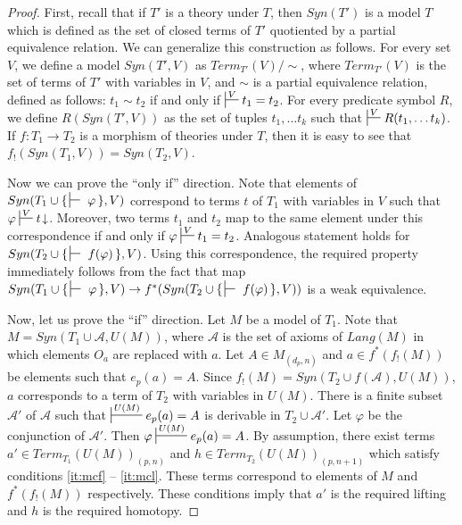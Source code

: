 \documentclass[reqno]{amsart}
\theoremstyle{definition}
\theoremstyle{remark}
\numberwithin{figure}{section}
\begin{document}
\begin{proof}
First, recall that if $T'$ is a theory under $T$, then $Syn(T')$ is a model $T$ which is defined as the set of closed terms of $T'$ quotiented by a partial equivalence relation.
We can generalize this construction as follows.
For every set $V$, we define a model $Syn(T',V)$ as $Term_{T'}(V)/\!\sim$, where $Term_{T'}(V)$ is the set of terms of $T'$ with variables in $V$,
and $\sim$ is a partial equivalence relation, defined as follows: $t_1 \sim t_2$ if and only if $\sststile{}{V} t_1 = t_2$.
For every predicate symbol $R$, we define $R(Syn(T',V))$ as the set of tuples $t_1, \ldots t_k$ such that $\sststile{}{V} R(t_1, \ldots t_k)$.
If $f : T_1 \to T_2$ is a morphism of theories under $T$, then it is easy to see that $f_!(Syn(T_1,V)) = Syn(T_2,V)$.

Now we can prove the ``only if'' direction.
Note that elements of $Syn(T_1 \cup \{\,\sststile{}{}~\varphi\,\}, V)$ correspond to terms $t$ of $T_1$ with variables in $V$ such that $\varphi \sststile{}{V} t\!\downarrow$.
Moreover, two terms $t_1$ and $t_2$ map to the same element under this correspondence if and only if $\varphi \sststile{}{V} t_1 = t_2$.
Analogous statement holds for $Syn(T_2 \cup \{\,\sststile{}{}~f(\varphi)\,\}, V)$.
Using this correspondence, the required property immediately follows from the fact that
map $Syn(T_1 \cup \{\,\sststile{}{}~\varphi\,\}, V) \to f^*(Syn(T_2 \cup \{\,\sststile{}{}~f(\varphi)\,\}, V))$ is a weak equivalence.

Now, let us prove the ``if'' direction.
Let $M$ be a model of $T_1$.
Note that $M = Syn(T_1 \cup \mathcal{A}, U(M))$, where $\mathcal{A}$ is the set of axioms of $Lang(M)$ in which elements $O_a$ are replaced with $a$.
Let $A \in M_{(d_p,n)}$ and $a \in f^*(f_!(M))$ be elements such that $e_p(a) = A$.
Since $f_!(M) = Syn(T_2 \cup f(\mathcal{A}), U(M))$, $a$ corresponds to a term of $T_2$ with variables in $U(M)$.
There is a finite subset $\mathcal{A}'$ of $\mathcal{A}$ such that $\sststile{}{U(M)} e_p(a) = A$ is derivable in $T_2 \cup \mathcal{A}'$.
Let $\varphi$ be the conjunction of $\mathcal{A}'$.
Then $\varphi \sststile{}{U(M)} e_p(a) = A$.
By assumption, there exist terms $a' \in Term_{T_1}(U(M))_{(p,n)}$ and $h \in Term_{T_2}(U(M))_{(p,n+1)}$ which satisfy conditions \eqref{it:mcf} -- \eqref{it:mcl}.
These terms correspond to elements of $M$ and $f^*(f_!(M))$ respectively.
These conditions imply that $a'$ is the required lifting and $h$ is the required homotopy.
\end{proof}
\end{document}
